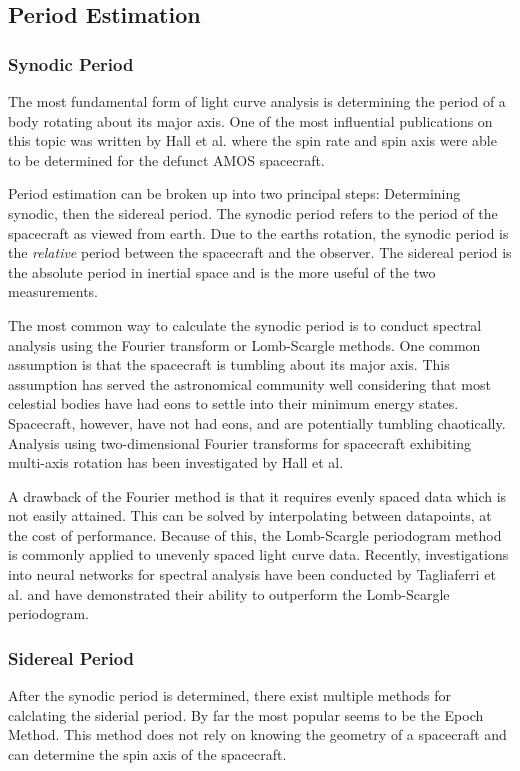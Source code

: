 \documentclass{article}
\begin{document}
\subsection{Period Estimation}
\subsubsection{Synodic Period}
The most fundamental form of light curve analysis is determining the period of a body rotating about its major axis. One of the most influential publications on this topic was written by Hall et al.\cite{AMOS} where the spin rate and spin axis were able to be determined for the defunct AMOS spacecraft. 

Period estimation can be broken up into two principal steps: Determining synodic, then the sidereal period. The synodic period refers to the period of the spacecraft as viewed from earth. Due to the earths rotation, the synodic period is the \textit{relative} period between the spacecraft and the observer. The sidereal period is the absolute period in inertial space and is the more useful of the two measurements. 

The most common way to calculate the synodic period is to conduct spectral analysis using the Fourier transform or Lomb-Scargle methods. One common assumption is that the spacecraft is tumbling about its major axis. This assumption has served the astronomical community well considering that most celestial bodies have had eons to settle into their minimum energy states. Spacecraft, however, have not had eons, and are potentially tumbling chaotically. \cite{AMOS} Analysis using two-dimensional Fourier transforms for spacecraft exhibiting multi-axis rotation has been investigated by Hall et al. \cite{Hall2014OpticalCO}

A drawback of the Fourier method is that it requires evenly spaced data which is not easily attained. This can be solved by interpolating between datapoints, at the cost of performance. Because of this, the Lomb-Scargle periodogram method is commonly applied to unevenly spaced light curve data. Recently, investigations into neural networks for spectral analysis have been conducted by Tagliaferri et al. \cite{Tagliaferri} and have demonstrated their ability to outperform the Lomb-Scargle periodogram.
\subsubsection{Sidereal Period}
After the synodic period is determined, there exist multiple methods for calclating the siderial period. By far the most popular seems to be the Epoch Method. This method does not rely on knowing the geometry of a spacecraft and can determine the spin axis of the spacecraft. 
\end{document}
